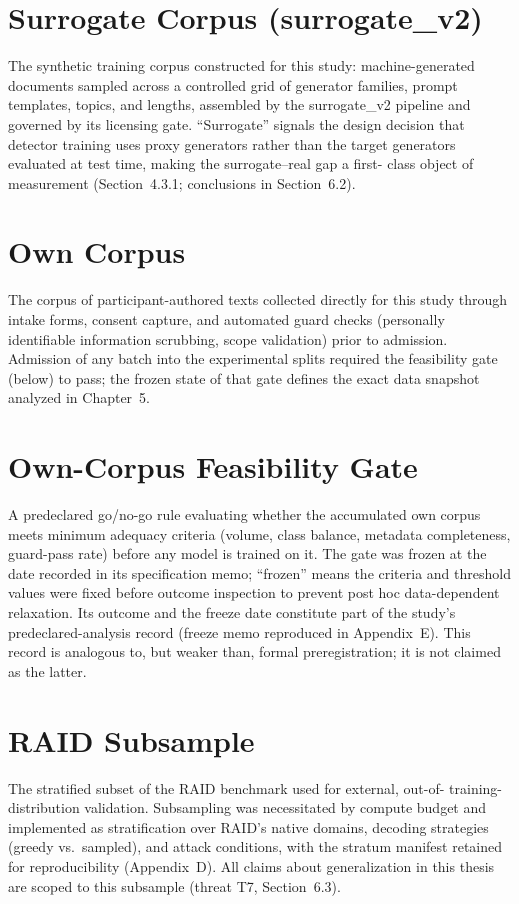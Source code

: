 \section{Surrogate Corpus (surrogate\_v2)}
The synthetic training corpus constructed for this study: machine-generated
documents sampled across a controlled grid of generator families, prompt
templates, topics, and lengths, assembled by the surrogate\_v2 pipeline and
governed by its licensing gate. ``Surrogate'' signals the design decision
that detector training uses proxy generators rather than the target
generators evaluated at test time, making the surrogate--real gap a first-
class object of measurement (Section~4.3.1; conclusions in Section~6.2).

\section{Own Corpus}
The corpus of participant-authored texts collected directly for this study
through intake forms, consent capture, and automated guard checks
(personally identifiable information scrubbing, scope validation) prior to
admission. Admission of any batch into the experimental splits required the
feasibility gate (below) to pass; the frozen state of that gate defines the
exact data snapshot analyzed in Chapter~5.

\section{Own-Corpus Feasibility Gate}
A predeclared go/no-go rule evaluating whether the accumulated own corpus
meets minimum adequacy criteria (volume, class balance, metadata
completeness, guard-pass rate) before any model is trained on it. The gate
was frozen at the date recorded in its specification memo; ``frozen''
means the criteria and threshold values were fixed before outcome
inspection to prevent post hoc data-dependent relaxation. Its outcome and
the freeze date constitute part of the study's predeclared-analysis record
(freeze memo reproduced in Appendix~E). This record is analogous to, but
weaker than, formal preregistration; it is not claimed as the latter.

\section{RAID Subsample}
The stratified subset of the RAID benchmark used for external, out-of-
training-distribution validation. Subsampling was necessitated by compute
budget and implemented as stratification over RAID's native domains,
decoding strategies (greedy vs.\ sampled), and attack conditions, with the
stratum manifest retained for reproducibility (Appendix~D). All claims
about generalization in this thesis are scoped to this subsample (threat
T7, Section~6.3).

